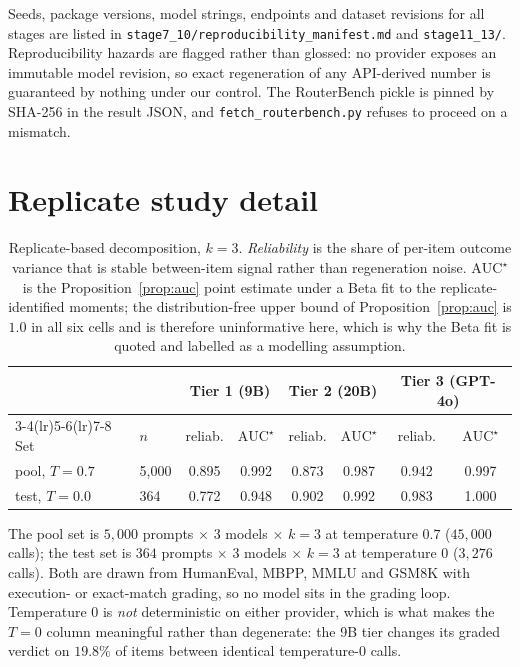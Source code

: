 Seeds, package versions, model strings, endpoints and dataset revisions for all
stages are listed in \texttt{stage7\_10/reproducibility\_manifest.md} and
\texttt{stage11\_13/}. Reproducibility hazards are flagged rather than glossed:
no provider exposes an immutable model revision, so exact regeneration of any
API-derived number is guaranteed by nothing under our control. The RouterBench
pickle is pinned by SHA-256 in the result JSON, and
\texttt{fetch\_routerbench.py} refuses to proceed on a mismatch.

\section{Replicate study detail}\label{app:rel}

\begin{table}[h]\centering\small
\caption{Replicate-based decomposition, $k=3$. \emph{Reliability} is the share
of per-item outcome variance that is stable between-item signal rather than
regeneration noise. $\mathrm{AUC}^\star$ is the Proposition~\ref{prop:auc} point
estimate under a Beta fit to the replicate-identified moments; the
distribution-free upper bound of Proposition~\ref{prop:auc} is $1.0$ in all six
cells and is therefore uninformative here, which is why the Beta fit is quoted
and labelled as a modelling assumption.}
\label{tab:rel}
\begin{tabular}{llcccccc}
\toprule
& & \multicolumn{2}{c}{Tier 1 (9B)} & \multicolumn{2}{c}{Tier 2 (20B)} & \multicolumn{2}{c}{Tier 3 (GPT-4o)}\\
\cmidrule(lr){3-4}\cmidrule(lr){5-6}\cmidrule(lr){7-8}
Set & $n$ & reliab. & $\mathrm{AUC}^\star$ & reliab. & $\mathrm{AUC}^\star$ & reliab. & $\mathrm{AUC}^\star$ \\
\midrule
pool, $T{=}0.7$ & 5{,}000 & 0.895 & 0.992 & 0.873 & 0.987 & 0.942 & 0.997 \\
test, $T{=}0.0$ & 364     & 0.772 & 0.948 & 0.902 & 0.992 & 0.983 & 1.000 \\
\bottomrule
\end{tabular}
\end{table}

The pool set is $5{,}000$ prompts $\times$ 3 models $\times$ $k=3$ at
temperature $0.7$ ($45{,}000$ calls); the test set is $364$ prompts $\times$ 3
models $\times$ $k=3$ at temperature $0$ ($3{,}276$ calls). Both are drawn from
HumanEval, MBPP, MMLU and GSM8K with execution- or exact-match grading, so no
model sits in the grading loop. Temperature $0$ is \emph{not} deterministic on
either provider, which is what makes the $T{=}0$ column meaningful rather than
degenerate: the 9B tier changes its graded verdict on $19.8\%$ of items between
identical temperature-$0$ calls.

